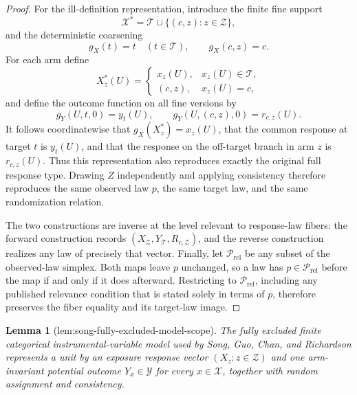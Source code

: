 \documentclass{article}
\newtheorem{lemma}{Lemma}
\begin{document}
\begin{proof}
For the ill-definition representation, introduce the finite fine support
\[
\mathcal X^*=\mathcal T\mathbin{\dot\cup}
\{(c,z):z\in\mathcal Z\},
\]
and the deterministic coarsening
\[
g_X(t)=t\quad(t\in\mathcal T),
\qquad g_X(c,z)=c.
\]
For each arm define
\[
X_z^*(U)=
\begin{cases}
x_z(U),&x_z(U)\in\mathcal T,\\
(c,z),&x_z(U)=c,
\end{cases}
\]
and define the outcome function on all fine versions by
\[
g_Y(U,t,0)=y_t(U),
\qquad
g_Y(U,(c,z),0)=r_{c,z}(U).
\]
It follows coordinatewise that \(g_X(X_z^*)=x_z(U)\), that the common response at target \(t\) is \(y_t(U)\), and that the response on the off-target branch in arm \(z\) is \(r_{c,z}(U)\).  Thus this representation also reproduces exactly the original full response type.  Drawing \(Z\) independently and applying consistency therefore reproduces the same observed law \(p\), the same target law, and the same randomization relation.

The two constructions are inverse at the level relevant to response-law fibers: the forward construction records \((X_{\mathcal Z},Y_{\mathcal T},R_{c,\mathcal Z})\), and the reverse construction realizes any law of precisely that vector.  Finally, let \(\mathcal P_{\mathrm{rel}}\) be any subset of the observed-law simplex.  Both maps leave \(p\) unchanged, so a law has \(p\in\mathcal P_{\mathrm{rel}}\) before the map if and only if it does afterward.  Restricting to \(\mathcal P_{\mathrm{rel}}\), including any published relevance condition that is stated solely in terms of \(p\), therefore preserves the fiber equality and its target-law image.
\end{proof}

\begin{lemma}[lem:song-fully-excluded-model-scope]\label{lem:song-fully-excluded-model-scope}
The fully excluded finite categorical instrumental-variable model used by Song, Guo, Chan, and Richardson represents a unit by an exposure response vector \((X_z:z\in\mathcal Z)\) and one arm-invariant potential outcome \(Y_x\in\mathcal Y\) for every \(x\in\mathcal X\), together with random assignment and consistency.
\end{lemma}
\end{document}
